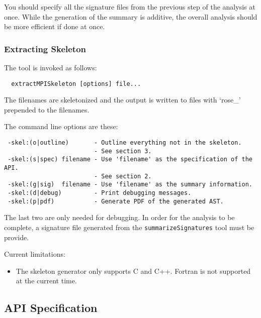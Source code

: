 You should specify all the signature files from the previous step of the
analysis at once. While the generation of the summary is additive, the overall
analysis should be more efficient if done at once.


\subsubsection{Extracting Skeleton}

The tool is invoked as follows:

\begin{verbatim}
  extractMPISkeleton [options] file...
\end{verbatim}

The filenames are skeletonized and the output is written to files with `rose\_'
prepended to the filenames.

The command line options are these:

\begin{verbatim}
 -skel:(o|outline)       - Outline everything not in the skeleton.
                         - See section 3.
 -skel:(s|spec) filename - Use 'filename' as the specification of the API.
                         - See section 2.
 -skel:(g|sig)  filename - Use 'filename' as the summary information.
 -skel:(d|debug)         - Print debugging messages.
 -skel:(p|pdf)           - Generate PDF of the generated AST.
\end{verbatim}

The last two are only needed for debugging. In order for the analysis to be
complete, a signature file generated from the \verb|summarizeSignatures| tool
must be provide.

Current limitations:

\begin{itemize}

\item The skeleton generator only supports C and C++.
    Fortran is not supported at the current time.

\end{itemize}

\subsection{API Specification}

